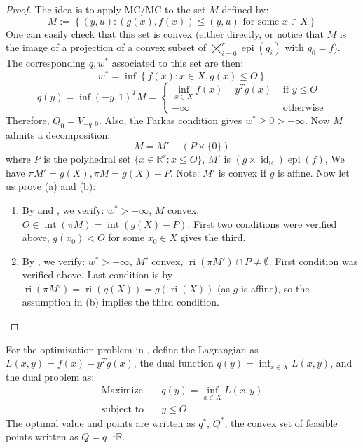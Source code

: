 \begin{proof}
	The idea is to apply MC/MC to the set $M$ defined by:
	\[
		M:=\left\{
		(y,u):(g(x),f(x))\leq (y,u)\text{ for some }x\in X
		\right\}
	\]
	One can easily check that this set is convex (either directly, or notice that $M$ is the image of a projection of a convex subset of $\bigtimes_{i=0}^r \operatorname{epi}(g_i)$ with $g_0=f$). The corresponding $q,w^\ast$ associated to this set are then:
	\[
		w^\ast = \inf \left\{f(x):x\in X,g(x)\leq O\right\}
	\]
	\[
		q(y) = \inf (-y,1)^TM = \begin{cases}
			\inf_{x\in X} f(x)-y^Tg(x) & \text{ if }y\leq O \\
			-\infty                    & \text{ otherwise}
		\end{cases}
	\]
	Therefore, $Q_0=V_{-q,0}$. Also, the Farkas condition gives $w^\ast \geq 0 > -\infty$. Now $M$ admits a decomposition:
	\[
		M=M'-\left(P\times \{0\}\right)
	\]
	where $P$ is the polyhedral set $\{x\in \mathbb{R}^{r}: x\leq O\}$, $M'$ is $\left(g\times {\operatorname{id}}_{\mathbb{R}}\right)\operatorname{epi}(f)$, We have $\pi M'=g(X),\pi M=g(X)-P$. Note: $M'$ is convex if $g$ is affine. Now let us prove (a) and (b):
	\begin{enumerate}[label=(\alph*)]
		\item By  and , we verify: $w^\ast>-\infty$, $M$ convex, $O\in \operatorname{int}(\pi M)=\operatorname{int}(g(X)-P)$. First two conditions were verified above, $g(x_0)<O$ for some $x_0\in X$ gives the third.
		\item By , we verify: $w^\ast>-\infty$, $M'$ convex, $\operatorname{ri}(\pi M')\cap P\neq\emptyset$. First condition was verified above. Last condition is by $\operatorname{ri}(\pi M')=\operatorname{ri}(g(X))=g(\operatorname{ri}(X))$ (as $g$ is affine), so the assumption in (b) implies the third condition. \qedhere
	\end{enumerate}
\end{proof}

\begin{defn}\label{defn:041-lagrangian-dual-prob}
	For the optimization problem in , define the Lagrangian as $L(x,y)=f(x)-y^Tg(x)$, the dual function $q(y)=\inf_{x\in X}L(x,y)$, and the dual problem as:
	\begin{align*}
		\text{Maximize}\quad   & q(y)=\inf_{x\in X}L(x,y) \\
		\text{subject to}\quad & y\leq O
	\end{align*}
	The optimal value and points are written as $q^\ast$, $Q^\ast$, the convex set of feasible points written as $Q=q^{-1}\mathbb{R}$.
\end{defn}

